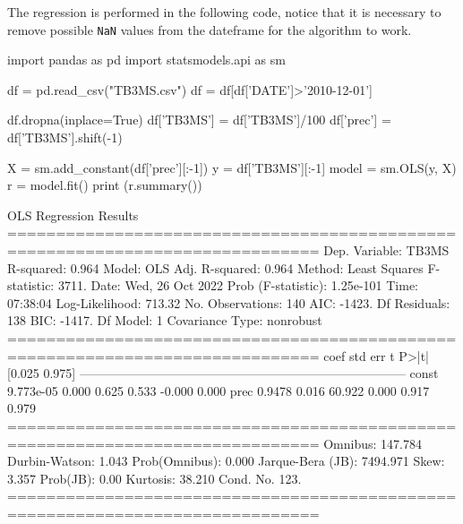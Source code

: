 The regression is performed in the following code, notice that it is necessary to remove possible \texttt{NaN} values from the dateframe for the algorithm to work. 

\begin{ipython}
import pandas as pd
import statsmodels.api as sm

df = pd.read_csv("TB3MS.csv")
df = df[df['DATE']>'2010-12-01']

df.dropna(inplace=True)
df['TB3MS'] = df['TB3MS']/100
df['prec'] = df['TB3MS'].shift(-1)

X = sm.add_constant(df['prec'][:-1])
y = df['TB3MS'][:-1]
model = sm.OLS(y, X)
r = model.fit()
print (r.summary())
\end{ipython}
\begin{ioutput}
                            OLS Regression Results                            
==============================================================================
Dep. Variable:                  TB3MS   R-squared:                       0.964
Model:                            OLS   Adj. R-squared:                  0.964
Method:                 Least Squares   F-statistic:                     3711.
Date:                Wed, 26 Oct 2022   Prob (F-statistic):          1.25e-101
Time:                        07:38:04   Log-Likelihood:                 713.32
No. Observations:                 140   AIC:                            -1423.
Df Residuals:                     138   BIC:                            -1417.
Df Model:                           1                                         
Covariance Type:            nonrobust                                         
==============================================================================
                 coef    std err          t      P>|t|      [0.025      0.975]
------------------------------------------------------------------------------
const       9.773e-05      0.000      0.625      0.533      -0.000       0.000
prec           0.9478      0.016     60.922      0.000       0.917       0.979
==============================================================================
Omnibus:                      147.784   Durbin-Watson:                   1.043
Prob(Omnibus):                  0.000   Jarque-Bera (JB):             7494.971
Skew:                           3.357   Prob(JB):                         0.00
Kurtosis:                      38.210   Cond. No.                         123.
==============================================================================
\end{ioutput}

